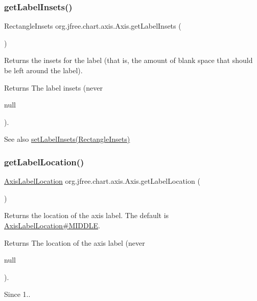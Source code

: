 \subsubsection{\texorpdfstring{get\+Label\+Insets()}{getLabelInsets()}}
{\footnotesize\ttfamily Rectangle\+Insets org.\+jfree.\+chart.\+axis.\+Axis.\+get\+Label\+Insets (\begin{DoxyParamCaption}{ }\end{DoxyParamCaption})}

Returns the insets for the label (that is, the amount of blank space that should be left around the label).

\begin{DoxyReturn}{Returns}
The label insets (never
\begin{DoxyCode}
null 
\end{DoxyCode}
 ).
\end{DoxyReturn}
\begin{DoxySeeAlso}{See also}
\mbox{\hyperlink{classorg_1_1jfree_1_1chart_1_1axis_1_1_axis_a970b20fba1da1a2de290f24306f12995}{set\+Label\+Insets(\+Rectangle\+Insets)}} 
\end{DoxySeeAlso}
\mbox{\label{classorg_1_1jfree_1_1chart_1_1axis_1_1_axis_a6cdaa1a27a6dbd3a090b9f87b2b58098}} 
\subsubsection{\texorpdfstring{get\+Label\+Location()}{getLabelLocation()}}
{\footnotesize\ttfamily \mbox{\hyperlink{classorg_1_1jfree_1_1chart_1_1axis_1_1_axis_label_location}{Axis\+Label\+Location}} org.\+jfree.\+chart.\+axis.\+Axis.\+get\+Label\+Location (\begin{DoxyParamCaption}{ }\end{DoxyParamCaption})}

Returns the location of the axis label. The default is \mbox{\hyperlink{classorg_1_1jfree_1_1chart_1_1axis_1_1_axis_label_location_aeb7faa19a7ce53da12faa53950eb8c75}{Axis\+Label\+Location\#\+M\+I\+D\+D\+LE}}.

\begin{DoxyReturn}{Returns}
The location of the axis label (never
\begin{DoxyCode}
null 
\end{DoxyCode}
 ).
\end{DoxyReturn}
\begin{DoxySince}{Since}
1.. 
\end{DoxySince}
\mbox{\label{classorg_1_1jfree_1_1chart_1_1axis_1_1_axis_a81988e297d1403bfb05c2d0ba038cac5}} 
